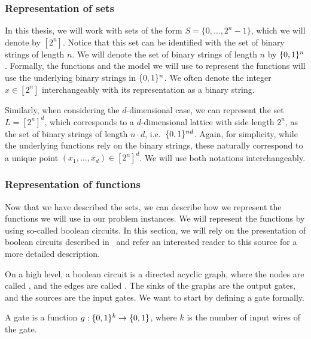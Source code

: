 \subsubsection{Representation of sets}

In this thesis, we will work with sets of the form $S = \{0, \dots, 2^n - 1\}$, which we will denote by $[2^n]$. Notice that this set can be identified with the set of binary strings of length $n$. We will denote the set of binary strings of length $n$ by $\{0, 1\}^n$. Formally, the functions and the model we will use to represent the functions will use the underlying binary strings in $\{0, 1\}^n$. We often denote the integer $x \in [2^n]$ interchangeably with its representation as a binary string.

Similarly, when considering the $d$-dimensional case, we can represent the set $L = {[2^n]}^d$, which corresponds to a $d$-dimensional lattice with side length $2^n$, as the set of binary strings of length $n \cdot d$, i.e.\ $\{0, 1\}^{nd}$. Again, for simplicity, while the underlying functions rely on the binary strings, these naturally correspond to a unique point $(x_1, \dots, x_d) \in {[2^n]}^d$. We will use both notations interchangeably.

\subsubsection{Representation of functions}

Now that we have described the sets, we can describe how we represent the functions we will use in our problem instances. We will represent the functions by using so-called boolean circuits. In this section, we will rely on the presentation of boolean circuits described in~ and refer an interested reader to this source for a more detailed description.

On a high level, a boolean circuit is a directed acyclic graph, where the nodes are called , and the edges are called . The sinks of the graphs are the output gates, and the sources are the input gates. We want to start by defining a gate formally.

\begin{definition}[Gate]
	A gate is a function $g : \{0, 1\}^k \rightarrow \{0, 1\}$, where $k$ is the number of input wires of the gate.
\end{definition}

